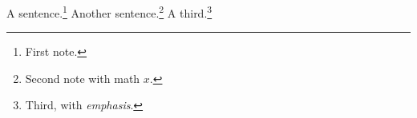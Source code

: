 \documentclass{article}
\begin{document}
A sentence.\footnote{First note.} Another sentence.\footnote{Second note with math $x$.}
A third.\footnote{Third, with \emph{emphasis}.}
\end{document}

